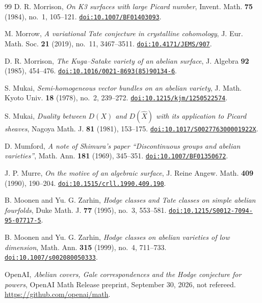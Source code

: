 \begin{thebibliography}{99}
D. R. Morrison,
\emph{On K3 surfaces with large Picard number},
Invent. Math. \textbf{75} (1984), no.~1, 105--121.
\href{https://doi.org/10.1007/BF01403093}{\texttt{doi:10.1007/BF01403093}}.

M. Morrow,
\emph{A variational Tate conjecture in crystalline cohomology},
J. Eur. Math. Soc. \textbf{21} (2019), no.~11, 3467--3511.
\href{https://doi.org/10.4171/JEMS/907}{\texttt{doi:10.4171/JEMS/907}}.

D. R. Morrison,
\emph{The Kuga--Satake variety of an abelian surface},
J. Algebra \textbf{92} (1985), 454--476.
\href{https://doi.org/10.1016/0021-8693(85)90134-6}%
{\texttt{doi:10.1016/0021-8693(85)90134-6}}.

S. Mukai,
\emph{Semi-homogeneous vector bundles on an abelian variety},
J. Math. Kyoto Univ. \textbf{18} (1978), no.~2, 239--272.
\href{https://doi.org/10.1215/kjm/1250522574}{\texttt{doi:10.1215/kjm/1250522574}}.

S. Mukai,
\emph{Duality between $D(X)$ and $D(\hat{X})$ with its application to Picard
sheaves},
Nagoya Math. J. \textbf{81} (1981), 153--175.
\href{https://doi.org/10.1017/S002776300001922X}{\texttt{doi:10.1017/S002776300001922X}}.

D. Mumford,
\emph{A note of Shimura's paper ``Discontinuous groups and abelian
varieties''},
Math. Ann. \textbf{181} (1969), 345--351.
\href{https://doi.org/10.1007/BF01350672}{\texttt{doi:10.1007/BF01350672}}.

J. P. Murre,
\emph{On the motive of an algebraic surface},
J. Reine Angew. Math. \textbf{409} (1990), 190--204.
\href{https://doi.org/10.1515/crll.1990.409.190}{\texttt{doi:10.1515/crll.1990.409.190}}.

B. Moonen and Yu. G. Zarhin,
\emph{Hodge classes and Tate classes on simple abelian fourfolds},
Duke Math. J. \textbf{77} (1995), no.~3, 553--581.
\href{https://doi.org/10.1215/S0012-7094-95-07717-5}{\texttt{doi:10.1215/S0012-7094-95-07717-5}}.

B. Moonen and Yu. G. Zarhin,
\emph{Hodge classes on abelian varieties of low dimension},
Math. Ann. \textbf{315} (1999), no.~4, 711--733.
\href{https://doi.org/10.1007/s002080050333}{\texttt{doi:10.1007/s002080050333}}.

OpenAI,
\emph{Abelian covers, Gale correspondences and the Hodge conjecture for powers},
OpenAI Math Release preprint, September 30, 2026, not refereed.
\url{https://github.com/openai/math}.


\end{thebibliography}
